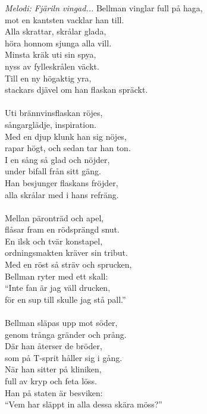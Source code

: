 {\footnotesize\textit{Melodi: Fjäriln vingad...}}
\vspace{10pt}
Bellman vinglar full på haga,\\
mot en kantsten vacklar han till.\\
Alla skrattar, skrålar glada,\\
höra honnom sjunga alla vill.\\
Minsta kräk uti sin spya,\\
nyss av fylleskrålen väckt.\\
Till en ny högaktig yra,\\
stackars djävel om han flaskan spräckt.\\
\\
Uti brännvinsflaskan röjes,\\
sångarglädje, inspiration.\\
Med en djup klunk han sig nöjes,\\
rapar högt, och sedan tar han ton.\\
I en sång så glad och nöjder,\\
under bifall från sitt gäng.\\
Han besjunger flaskans fröjder,\\
alla skrålar med i hans refräng.\\
\\
Mellan päronträd och apel,\\
flåsar fram en rödsprängd snut.\\
En ilsk och tvär konstapel,\\
ordningsmakten kräver sin tribut.\\
Med en röst så sträv och sprucken,\\
Bellman ryter med ett skall:\\
``Inte fan är jag väll drucken,\\
för en sup till skulle jag stå pall.''\\
\\
Bellman släpas upp mot söder,\\
genom trånga gränder och prång.\\
Där han återser de bröder,\\
som på T-sprit håller sig i gång.\\
När han sitter på kliniken,\\
full av kryp och feta löss.\\
Han på staten är besviken:\\
``Vem har släppt in alla dessa skära möss?''
